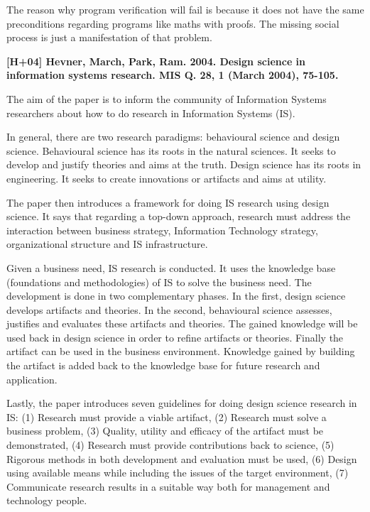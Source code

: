 \documentclass[a4paper,12pt,english]{scrartcl}
\newcommand{\papertitle}[2]{
	\noindent
	\textbf{\textsf{{\large
		[#1] #2
	}}}
	\vspace{2mm}
}
\begin{document}
The reason why program verification will fail is because it does not have the
same preconditions regarding programs like maths with proofs. The missing social
process is just a manifestation of that problem.

\vspace{8mm}

\papertitle{H+04}{Hevner, March, Park, Ram. 2004. Design science in information
				  systems research. MIS Q. 28, 1 (March 2004), 75-105.}

The aim of the paper is to inform the community of Information Systems
researchers about how to do research in Information Systems (IS).

In general, there are two research paradigms: behavioural science and design
science. Behavioural science has its roots in the natural sciences. It seeks to
develop and justify theories and aims at the truth. Design science has its roots
in engineering. It seeks to create innovations or artifacts and aims at utility.

The paper then introduces a framework for doing IS research using design
science. It says that regarding a top-down approach, research must address the
interaction between business strategy, Information Technology strategy,
organizational structure and IS infrastructure.

Given a business need, IS research is conducted. It uses the knowledge base
(foundations and methodologies) of IS to solve the business need. The
development is done in two complementary phases. In the first, design science
develops artifacts and theories. In the second, behavioural science assesses,
justifies and evaluates these artifacts and theories. The gained knowledge will
be used back in design science in order to refine artifacts or theories. Finally
the artifact can be used in the business environment. Knowledge gained by
building the artifact is added back to the knowledge base for future research
and application.

Lastly, the paper introduces seven guidelines for doing design science research
in IS: (1) Research must provide a viable artifact, (2) Research must solve a
business problem, (3) Quality, utility and efficacy of the artifact must be
demonstrated, (4) Research must provide contributions back to science,
(5) Rigorous methods in both development and evaluation must be used, (6) Design
using available means while including the issues of the target environment,
(7) Communicate research results in a suitable way both for management and
technology people.
\end{document}

